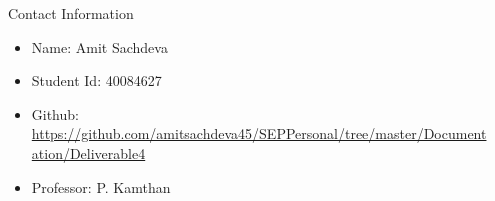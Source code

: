 \documentclass[final]{beamer}
\newlength{\sepwid}
\newlength{\onecolwid}
\begin{document}
\begin{frame}
\begin{columns}[t]
\begin{column}{\onecolwid}
\begin{block}{Contact Information}
\small{\begin{itemize}
\item Name: Amit Sachdeva
\item Student Id: 40084627
\item Github: \url{https://github.com/amitsachdeva45/SEPPersonal/tree/master/Documentation/Deliverable4}
\item Professor: P. Kamthan
\end{itemize}}

\end{block}



\end{column} %

\begin{column}{\sepwid}\end{column} %

\end{columns} %

\end{frame} %
\end{document}

